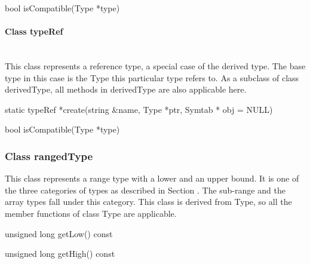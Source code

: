 \begin{apient}
bool isCompatible(Type *type)
\end{apient}

\paragraph{Class typeRef }
\mbox{ }\\

This class represents a reference type, a special case of the derived type. The base type in this case is the Type this particular type refers to. As a subclass of class derivedType, all methods in derivedType are also applicable here. 


\begin{apient}
static typeRef *create(string &name, Type *ptr, Symtab * obj = NULL)
\end{apient}

\begin{apient}
bool isCompatible(Type *type)
\end{apient}

\subsubsection{Class rangedType}
This class represents a range type with a lower and an upper bound. It is one of the three categories of types as described in Section . The sub-range and the array types fall under this category. This class is derived from Type, so all the member functions of class Type are applicable.


\begin{apient}
unsigned long getLow() const
\end{apient}

\begin{apient}
unsigned long getHigh() const
\end{apient}

